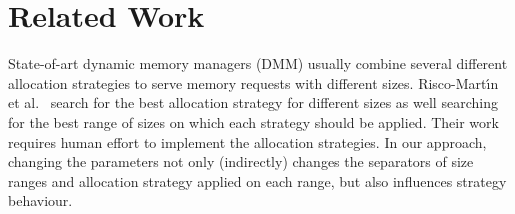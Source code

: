 \section{Related Work}

State-of-art dynamic memory managers (DMM) usually combine several
different allocation strategies to serve memory requests with different
sizes. Risco-Mart\'{\i}n et al.~\cite{RiscoMartín2014109,
Colmenar:2011:MOD:2001576.2001820} search for the best allocation strategy
for different sizes as well searching for the best range of sizes on which
each strategy should be applied. 
Their work requires human effort to implement the
allocation strategies. In our approach, changing the parameters not
only (indirectly) changes the separators of size ranges and allocation
strategy applied on each range, but also influences strategy behaviour. 




